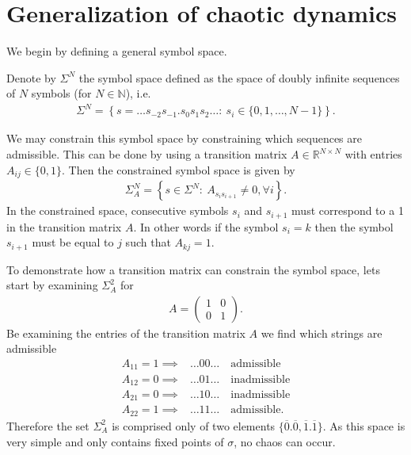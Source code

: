\section{Generalization of chaotic dynamics}
We begin by defining a general symbol space.
\begin{definition}
	Denote by $\Sigma^{N}$ the symbol space defined as the space of doubly infinite sequences of $N$ symbols (for $N \in \mathbb{N}$), i.e.
\begin{align}
	\boxed{
		\Sigma^{N} = \left\{ s=\ldots s_{-2} s_{-1} \bm{.} s_0s_1s_2 \ldots:\ s_i \in \{0, 1, \ldots, N-1\} \right\}.
	}
\end{align}
\end{definition}

We may constrain this symbol space by constraining which sequences are admissible. This can be done by using a transition matrix $A \in \mathbb{R}^{N \times N}$ with entries $A_{ij}\in \{0,1\}$. Then the constrained symbol space is given by
\begin{align}
	\Sigma_{A}^{N} = \left\{ s \in \Sigma^{N}:\ A_{s_i s_{i+1}} \neq 0,\forall i \right\}.
\end{align}
In the constrained space, consecutive symbols $s_i$ and $s_{i+1}$ must correspond to a 1 in the transition matrix $A$. In other words if the symbol $s_i=k$ then the symbol $s_{i+1}$ must be equal to $j$ such that $A_{kj}=1$.

\begin{ex}
	To demonstrate how a transition matrix can constrain the symbol space, lets start by examining $\Sigma_{A}^{2}$ for
	\begin{align}
		A =
		\begin{pmatrix}
			1 & 0 \\
			0 & 1
		\end{pmatrix}
		.
	\end{align}
	Be examining the entries of the transition matrix $A$ we find which strings are admissible
	\begin{align*}
		A_{11}=1 \implies& \ldots 00\ldots \quad \textrm{admissible} \\
		A_{12}=0 \implies& \ldots 01\ldots \quad \textrm{inadmissible} \\
		A_{21}=0 \implies& \ldots 10\ldots \quad \textrm{inadmissible} \\
		A_{22}=1 \implies& \ldots 11\ldots \quad \textrm{admissible}. 
	\end{align*}	
	Therefore the set $\Sigma_{A}^{2}$ is comprised only of two elements $\{\overline{0}\bm{.} \overline{0}, \overline{1}\bm{.} \overline{1}\}$. As this space is very simple and only contains fixed points of $\sigma$, no chaos can occur.
\end{ex}

